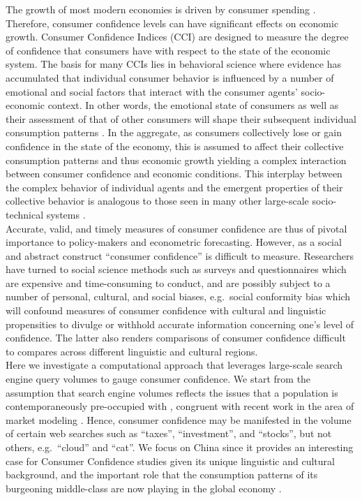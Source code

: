\documentclass[10pt]{article}
\begin{document}
The growth of most modern economies is driven by consumer spending \cite{Deaton1980}. Therefore, consumer confidence levels can 
have significant effects on economic growth. Consumer Confidence Indices (CCI) are designed to measure the degree of
confidence that consumers have with respect to the state of the economic system. The basis for many CCIs lies in behavioral science
where evidence has accumulated that individual consumer behavior is influenced by a number of
emotional and social factors \cite{Kietzmann2011,Bollen2011} that interact with the consumer agents' socio-economic context.
In other words, the emotional state of consumers as well as their 
assessment of that of other consumers will shape their subsequent individual consumption patterns \cite{Frijda1994, Shi2014}.
In the aggregate, as consumers collectively lose or gain confidence in the state of the economy, this is assumed to affect their
collective consumption patterns and thus economic growth yielding a complex interaction between consumer
confidence and economic conditions. This interplay between the complex behavior of individual agents and the emergent properties of
their collective behavior is analogous to those seen in many other large-scale socio-technical systems \cite{vespignani:sociotechn2012}.\\


Accurate, valid, and timely measures of consumer confidence
are thus of pivotal importance to policy-makers and econometric forecasting. However, as a social 
and abstract construct ``consumer confidence'' is difficult to measure. Researchers have turned
to social science methods such as surveys and questionnaires which are expensive and time-consuming to conduct, and are possibly subject to
a number of personal, cultural, and social biases, e.g.~social conformity bias \cite{Nickerson1998} which will confound measures of consumer confidence
with cultural and linguistic propensities to divulge or withhold accurate information concerning one's level of confidence. The latter
also renders comparisons of consumer confidence difficult to compares across different linguistic and cultural regions.\\

Here we investigate a computational approach that leverages large-scale search engine query volumes to gauge consumer confidence.
We start from the assumption that search engine volumes reflects the issues that a population is contemporaneously pre-occupied with  \cite{Scott2014}, 
congruent with recent work in the area of market modeling \cite{Curme28072014,preis:quantifying2013}. 
Hence, consumer confidence may be manifested in the volume of certain web searches such as ``taxes'', ``investment'', and ``stocks'', but not
others, e.g.~``cloud'' and ``cat''. We focus on China since it provides an interesting case for Consumer Confidence studies given
its unique linguistic and cultural background, and the important role that the consumption patterns of its burgeoning middle-class 
are now playing in the global economy \cite{Webman2014}.\\
\end{document}
